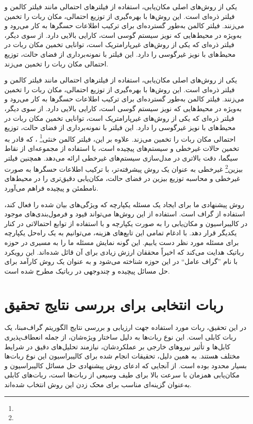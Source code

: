 یکی از روش‌های اصلی مکان‌یابی، استفاده از فیلترهای احتمالی مانند فیلتر کالمن و فیلتر ذره‌ای است. این روش‌ها با بهره‌گیری از توزیع احتمالی، مکان ربات را تخمین می‌زنند. فیلتر کالمن به‌طور گسترده‌ای برای ترکیب اطلاعات حسگرها به کار می‌رود و به‌ویژه در محیط‌هایی که نویز سیستم گوسی است، کارایی بالایی دارد. از سوی دیگر، فیلتر ذره‌ای که یکی از روش‌های غیرپارامتریک است، توانایی تخمین مکان ربات در محیط‌های با نویز غیرگوسی را دارد. این فیلتر با نمونه‌برداری از فضای حالت، توزیع احتمالی مکان ربات را تخمین می‌زند.

یکی از روش‌های اصلی مکان‌یابی، استفاده از فیلترهای احتمالی مانند فیلتر کالمن و فیلتر ذره‌ای است. این روش‌ها با بهره‌گیری از توزیع احتمالی، مکان ربات را تخمین می‌زنند. فیلتر کالمن به‌طور گسترده‌ای برای ترکیب اطلاعات حسگرها به کار می‌رود و به‌ویژه در محیط‌هایی که نویز سیستم گوسی است، کارایی بالایی دارد. از سوی دیگر، فیلتر ذره‌ای که یکی از روش‌های غیرپارامتریک است، توانایی تخمین مکان ربات در محیط‌های با نویز غیرگوسی را دارد. این فیلتر با نمونه‌برداری از فضای حالت، توزیع احتمالی مکان ربات را تخمین می‌زند. علاوه بر این، فیلتر کالمن خنثی\footnote{}
، که قادر به تخمین حالات غیرخطی و سیستم‌های پیچیده است، با استفاده از مجموعه‌ای از نقاط سیگما، دقت بالاتری در مدل‌سازی سیستم‌های غیرخطی ارائه می‌دهد. همچنین فیلتر بیزین\footnote{}
 غیرخطی به عنوان یک روش پیشرفته‌تر، با ترکیب اطلاعات حسگرها به صورت غیرخطی و محاسبه توزیع بیزین در فضای حالت، مکان‌یابی دقیق‌تری را در محیط‌های نامطمئن و پیچیده فراهم می‌آورد.

روش پیشنهادی ما برای ایجاد یک مسئله یکپارچه که ویژگی‌های بیان شده را فعال کند، استفاده از گراف است. استفاده از این روش‌ها می‌تواند قیود و فرمول‌بندی‌های موجود در کالیبراسیون و مکان‌یابی را به صورت یکپارچه و با استفاده از توابع احتمالاتی در کنار یکدیگر قرار دهد. با ادغام تمامی این تابع‌های هزینه، می‌توانیم به یک راه‌حل یکپارچه برای مسئله مورد نظر دست یابیم. این گونه نمایش‌ مسئله ما را به مسیری در حوزه رباتیک هدایت می‌کند که اخیراً محققان ارزش زیادی برای آن قائل شده‌اند. این رویکرد با نام ”گراف عامل“ در این حوزه شناخته می‌شود و به عنوان یک روش کارآمد برای حل مسائل پیچیده و چندوجهی در رباتیک مطرح شده است. 

\section{ربات انتخابی برای بررسی نتایج تحقیق}

در این تحقیق، ربات مورد استفاده جهت ارزیابی و بررسی نتایج الگوریتم گراف‌مبنا، یک ربات کابلی است. این نوع ربات‌ها به دلیل ساختار ویژه‌شان، از جمله انعطاف‌پذیری کابل‌ها و تأثیر نیروهای خارجی بر عملکردشان، نیازمند تحلیل‌های دقیق در شرایط مختلف هستند. به همین دلیل، تحقیقات انجام شده برای کالیبراسیون این نوع ربات‌ها بسیار محدود بوده است. از آنجایی که ادعای روش پیشنهادی حل مسائل کالیبراسیون و مکان‌یابی همزمان با سرعت بالا برای طیف وسیعی از ربات‌ها است، ربات‌های کابلی به‌عنوان گزینه‌ای مناسب برای محک زدن این روش انتخاب شده‌اند.

